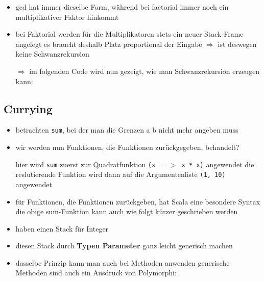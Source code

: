 \begin{itemize}
  \item gcd hat immer dieselbe Form, während bei factorial immer noch ein
  multiplikativer Faktor hinkommt
  \item bei Faktorial werden für die Multiplikatoren stets ein neuer
  Stack-Frame angelegt \und es braucht deshalb Platz proportional der
  Eingabe $\Rightarrow$ ist deswegen keine Schwanzrekursion
  
  $\Rightarrow$ im folgenden Code wird nun gezeigt, wie man Schwanzrekursion
  erzeugen kann:
  
  
\end{itemize}


\subsection{Currying}
\begin{itemize}
  \item betrachten \texttt{sum}, bei der man die Grenzen a \und b nicht mehr
  angeben muss
  
  
  
  \item wir werden nun Funktionen, die Funktionen zurückgegeben,
  behandelt?
  
  
  
  hier wird \texttt{sum} zuerst zur Quadratfunktion \texttt{(x $=>$ x * x)}
  angewendet \und die reslutierende Funktion wird dann auf die Argumentenliste
  \texttt{(1, 10)} angewendet
  \item für Funktionen, die Funktionen zurückgeben, hat Scala eine besondere
  Syntax \und die obige sum-Funktion kann auch wie folgt kürzer geschrieben
  werden
  
  
  
\end{itemize}




\begin{itemize}
  \item haben einen Stack für Integer
  
  
  
  \item diesen Stack durch \textbf{Typen Parameter} ganz leicht generisch machen
  
  
  
  \item dasselbe Prinzip kann man auch bei Methoden anwenden \und generische
  Methoden sind auch ein Ausdruck von Polymorphi:
  
  
\end{itemize}
\pagebreak


